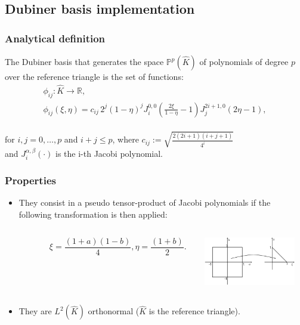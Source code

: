 \documentclass[9pt]{beamer}
\begin{document}
\begin{frame}
\section{Dubiner basis implementation}
\frametitle{Analytical definition}
\begin{definition} \label{dubiner}
	The Dubiner basis that generates the space $\mathbb{P}^p(\hat{K})$ of polynomials of degree $p$ over the reference triangle is the set of functions:
	\begin{equation*}
	\begin{gathered}
	 \phi_{ij}: \hat{K} \rightarrow \mathbb{R}, \\
	\phi_{ij}(\xi,\eta) =c_{ij} \, 2^j (1-\eta)^j J_i^{0,0}(\frac{2\xi}{1-\eta}-1) J_j^{2i+1,0} (2\eta-1),
	\end{gathered}
	\end{equation*}
	\vspace{2mm} \\
	\center
	for $i,j=0,\dots,p$ and $i+j \le p$, where $c_{ij} := \sqrt{\frac{2(2i+1)(i+j+1)}{4^i}}$ \\
	and $J_i^{\alpha,\beta}(\cdot)$ is the i-th Jacobi polynomial.
\end{definition}
\end{frame}

\begin{frame}
\frametitle{Properties}
\begin{itemize}
	\item They consist in a pseudo tensor-product of Jacobi polynomials if the following transformation is then applied:
	\begin{columns}
		\begin{column}{0.5\textwidth}
			\begin{equation*}\label{transformation_formula}
			\quad \quad \quad \xi=\frac{(1+a)(1-b)}{4},  \eta=\frac{(1+b)}{2}.
			\end{equation*}
		\end{column}
		\begin{column}{0.5\textwidth}  
			\includegraphics[width = 4cm]{./transformation.png}
		\end{column}
	\end{columns}
    \item They are $L^2(\hat{K})$ orthonormal ($\hat{K}$ is the reference triangle).
\end{itemize}
\end{frame}
\end{document}
